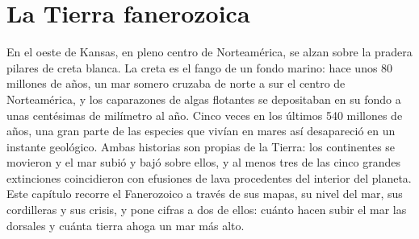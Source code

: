 \chapter{La Tierra fanerozoica}\label{ch:b2:phanerozoic-earth}

En el oeste de Kansas, en pleno centro de Norteamérica, se alzan sobre la pradera pilares de creta blanca.
La creta es el fango de un fondo marino: hace unos 80 millones de años, un
mar somero cruzaba de norte a sur el centro de Norteamérica, y los caparazones de
algas flotantes se depositaban en su fondo a unas centésimas de milímetro al año. Cinco veces en los
últimos 540 millones de años, una gran parte de las especies que vivían en mares así desapareció en un
instante geológico. Ambas historias son propias de la Tierra: los continentes se movieron y el mar subió y bajó sobre
ellos, y al menos tres de las cinco grandes extinciones coincidieron con efusiones de lava procedentes del interior
del planeta. Este capítulo recorre el Fanerozoico a través de sus mapas, su nivel del mar, sus cordilleras
y sus crisis, y pone cifras a dos de ellos: cuánto hacen subir el mar las dorsales y cuánta
tierra ahoga un mar más alto.

